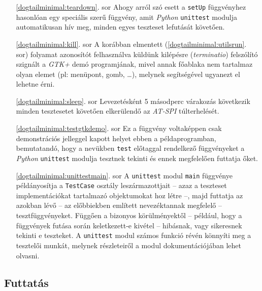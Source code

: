 \begin{enumerate}
 \item[\ref{dogtailminimal:teardown}. sor] Ahogy arról szó esett a \texttt{setUp} függvényhez hasonlóan egy speciális szerű függvény, amit \textit{Python} \texttt{unittest} modulja automatikusan hív meg, minden egyes teszteset lefutását követően.

 \item[\ref{dogtailminimal:kill}. sor] A korábban elmentett (\ref{dogtailminimal:utilsrun}. sor) folyamat azonosítót felhasználva küldünk kilépésre (\textit{terminatio}) felszólító szignált a \textit{GTK+} demó programjának, mivel annak főablaka nem tartalmaz olyan elemet (pl: menüpont, gomb, \dots), melynek segítségével ugyanezt el lehetne érni.

 \item[\ref{dogtailminimal:sleep}. sor] Levezetésként 5 másodperc várakozás következik minden tesztesetet követően elkerülendő az \textit{AT-SPI} túlterhelését.

 \item[\ref{dogtailminimal:testgtkdemo}. sor] Ez a függvény voltaképpen csak demonstrációs jelleggel kapott helyet ebben a példaprogramban, bemutatandó, hogy a nevükben \texttt{test} előtaggal rendelkező függvényeket a \textit{Python} \texttt{unittest} modulja tesztnek tekinti és ennek megfelelően futtatja őket.

 \item[\ref{dogtailminimal:unittestmain}. sor] A \texttt{unittest} modul \texttt{main} függvénye példányosítja a \texttt{TestCase} osztály leszármazottjait -- azaz a teszteset implementációkat tartalmazó objektumokat hoz létre --, majd futtatja az azokban lévő -- az előbbiekben említett nevezéktannak megfelelő -- tesztfüggvényeket. Függően a bizonyos körülményektől -- például, hogy a függvények futása során keletkezett-e kivétel -- hibásnak, vagy sikeresnek tekinti e teszteket. A \texttt{unittest} modul számos funkció révén könnyíti meg a tesztelői munkát, melynek részleteiről a modul dokumentációjában lehet olvasni.

\end{enumerate}

\subsection{Futtatás}

